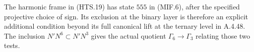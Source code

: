 The harmonic frame in (HTS.19) has state $555$
in (MIF.6), after the specified projective choice
of sign.  Its exclusion at the binary layer is
therefore an explicit additional condition beyond
its full canonical lift at the ternary level in
A.4.48.  The inclusion
$N'N^6\subset N'N^3$ gives the actual quotient
$\Gamma_6\to\Gamma_3$ relating those two tests.
